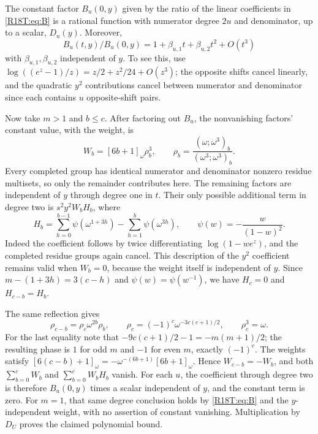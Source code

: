 \documentclass[11pt,a4paper]{article}
\begin{document}
The constant factor \(B_u(0,y)\) given by the ratio of the linear
coefficients in \eqref{R18T:eq:B} is a rational function with numerator
degree \(2u\) and denominator, up to a scalar, \(D_u(y)\).
Moreover,
\[
 B_u(t,y)/B_u(0,y)=1+\beta_{u,1}t+\beta_{u,2}t^2+O(t^3)
\]
with \(\beta_{u,1},\beta_{u,2}\) independent of \(y\).
To see this, use \(\log((e^z-1)/z)=z/2+z^2/24+O(z^3)\);
the opposite shifts cancel linearly, and the quadratic \(y^2\)
contributions cancel between numerator and denominator since each
contains \(u\) opposite-shift pairs.

Now take \(m>1\) and \(b\le c\). After factoring out \(B_u\),
the nonvanishing factors' constant value, with the weight, is
\[
 W_b=[6b+1]_\omega \rho_b^3,\qquad
 \rho_b=\frac{(\omega;\omega^3)_b}{(\omega^3;\omega^3)_b}.
\]
Every completed group has identical numerator and denominator
nonzero residue multisets, so only the remainder contributes here.
The remaining factors are independent of \(y\) through degree one
in \(t\). Their only possible additional term in degree two is
\(s^2 y^2 W_b H_b\), where
\[
 H_b=\sum_{h=0}^{b-1}\psi(\omega^{1+3h})
       -\sum_{h=1}^b\psi(\omega^{3h}),\qquad
 \psi(w)=-\frac{w}{(1-w)^2}.
\]
Indeed the coefficient follows by twice differentiating
\(\log(1-we^z)\), and the completed residue groups again cancel.
This description of the \(y^2\) coefficient remains valid when
\(W_b=0\), because the weight itself is independent of \(y\).
Since \(m-(1+3h)=3(c-h)\) and \(\psi(w)=\psi(w^{-1})\),
we have \(H_c=0\) and \(H_{c-b}=H_b\).

The same reflection gives
\[
 \rho_{c-b}=\rho_c\omega^{2b}\rho_b,\qquad
 \rho_c=(-1)^c\omega^{-3c(c+1)/2},\qquad
 \rho_c^3=\omega .
\]
For the last equality note that
\(-9c(c+1)/2-1=-m(m+1)/2\); the resulting phase is \(1\) for
odd \(m\) and \(-1\) for even \(m\), exactly \((-1)^c\).
The weights satisfy
\([6(c-b)+1]_\omega=-\omega^{-(6b+1)}[6b+1]_\omega\).
Hence \(W_{c-b}=-W_b\), and both \(\sum_{b=0}^c W_b\) and
\(\sum_{b=0}^c W_bH_b\) vanish. For each \(u\), the coefficient
through degree two is therefore \(B_u(0,y)\) times a scalar
independent of \(y\), and the constant term is zero.
For \(m=1\), that same degree conclusion holds by \eqref{R18T:eq:B}
and the \(y\)-independent weight, with no assertion of constant
vanishing. Multiplication by \(D_U\) proves the claimed polynomial bound.
\end{document}
